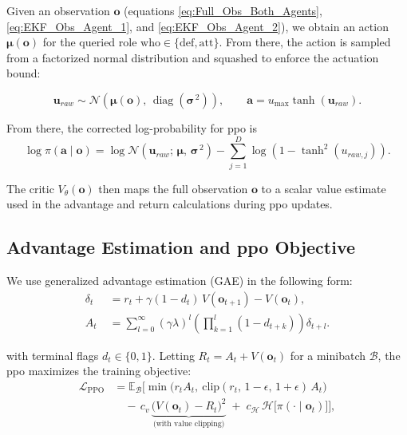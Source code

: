 Given an observation \(\mathbf{o}\) (equations \ref{eq:Full_Obs_Both_Agents}, \ref{eq:EKF_Obs_Agent_1}, and \ref{eq:EKF_Obs_Agent_2}), we obtain an action $\boldsymbol{\mu}(\mathbf{o})$ for the queried role \(\mathrm{who}\in\{\mathrm{def},\mathrm{att}\}\). From there, the action is sampled from a factorized normal distribution and squashed to enforce the actuation bound:

\[
\mathbf{u}_{raw} \sim \mathcal{N}\!\left(\boldsymbol{\mu}(\mathbf{o}),\, \operatorname{diag}\!\left(\boldsymbol{\sigma}^{\,2}\right)\right),
\qquad
\mathbf{a} = u_{\max}\tanh\!\left(\mathbf{u}_{raw}\right).
\]

From there, the corrected log-probability for \acs{ppo} is
\[
\log \pi(\mathbf{a} \mid \mathbf{o})
=
\log \mathcal{N}\!\left(\mathbf{u}_{raw};\, \boldsymbol{\mu},\, \boldsymbol{\sigma}^{\,2}\right)
-
\sum_{j=1}^{D}\log\!\left(1-\tanh^2(u_{raw,j})\right).
\]


The critic \(V_\theta(\mathbf{o})\) then maps the full observation \(\mathbf{o}\) to a scalar value estimate used in the advantage and return calculations during \acs{ppo} updates.



\subsection{Advantage Estimation and \acs{ppo} Objective}
\label{subsec:advantage-estimation-ppo}
We use generalized advantage estimation (GAE) in the following form:
\[
\begin{aligned}
\delta_t \;&= r_t + \gamma(1-d_t)\,V(\mathbf{o}_{t+1}) - V(\mathbf{o}_{t}),\\[4pt]
A_t \;&= \sum_{l=0}^{\infty} (\gamma\lambda)^l
\left(\prod_{k=1}^{l} (1-d_{t+k})\right)\delta_{t+l}.
\end{aligned}
\]

with terminal flags \(d_t\in\{0,1\}\). Letting  \(R_t=A_t+V(\mathbf{o}_t)\) for a minibatch \(\mathcal{B}\), the \acs{ppo} maximizes the training objective:
\begin{align*}
\mathcal{L}_{\text{PPO}}
&= \mathbb{E}_{\mathcal{B}}\Big[
\min\!\big(r_t A_t,\ \mathrm{clip}(r_t,\,1{-}\epsilon,\,1{+}\epsilon)\,A_t\big)
\\
&\quad -\, c_v\,\underbrace{\big(V(\mathbf{o}_t) - R_t\big)^2}_{\text{(with value clipping)}}
\;+\; c_{\mathcal{H}}\,\mathcal{H}\!\big[\pi(\cdot\!\mid \mathbf{o}_t)\big]
\Big],
\end{align*}

